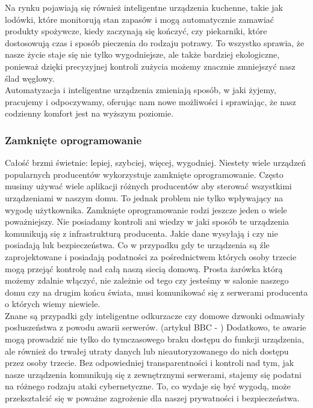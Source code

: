Na rynku pojawiają się również inteligentne urządzenia kuchenne, takie jak lodówki, które monitorują stan zapasów i mogą automatycznie zamawiać produkty spożywcze, kiedy zaczynają się kończyć, czy piekarniki, które dostosowują czas i sposób pieczenia do rodzaju potrawy. To wszystko sprawia, że nasze życie staje się nie tylko wygodniejsze, ale także bardziej ekologiczne, ponieważ dzięki precyzyjnej kontroli zużycia możemy znacznie zmniejszyć nasz ślad węglowy.\\

Automatyzacja i inteligentne urządzenia zmieniają sposób, w jaki żyjemy, pracujemy i odpoczywamy, oferując nam nowe możliwości i sprawiając, że nasz codzienny komfort jest na wyższym poziomie.

\newpage

\subsubsection{Zamknięte oprogramowanie}
Całość brzmi świetnie: lepiej, szybciej, więcej, wygodniej. Niestety wiele urządzeń popularnych producentów wykorzystuje zamknięte oprogramowanie. Często musimy używać wiele aplikacji różnych producentów aby sterować wszystkimi urządzeniami w naszym domu. To jednak problem nie tylko wpływający na wygodę użytkownika. Zamknięte oprogramowanie rodzi jeszcze jeden o wiele poważniejszy. Nie posiadamy kontroli ani wiedzy w jaki sposób te urządzenia komunikują się z infrastrukturą producenta. Jakie dane wysyłają i czy nie posiadają luk bezpieczeństwa. Co w przypadku gdy te urządzenia są źle zaprojektowane i posiadają podatności za pośrednictwem których osoby trzecie mogą przejąć kontrolę nad całą naszą siecią domową. Prosta żarówka którą możemy zdalnie włączyć, nie zależnie od tego czy jesteśmy w salonie naszego domu czy na drugim końcu świata, musi komunikować się z serwerami producenta o których wiemy niewiele.\\

Znane są przypadki gdy inteligentne odkurzacze czy domowe dzwonki odmawiały posłuszeństwa z powodu awarii serwerów. (artykuł BBC - \cite{amazonoutage}) Dodatkowo, te awarie mogą prowadzić nie tylko do tymczasowego braku dostępu do funkcji urządzenia, ale również do trwałej utraty danych lub nieautoryzowanego do nich dostępu przez osoby trzecie. Bez odpowiedniej transparentności i kontroli nad tym, jak nasze urządzenia komunikują się z zewnętrznymi serwerami, stajemy się podatni na różnego rodzaju ataki cybernetyczne. To, co wydaje się być wygodą, może przekształcić się w poważne zagrożenie dla naszej prywatności i bezpieczeństwa.\\

